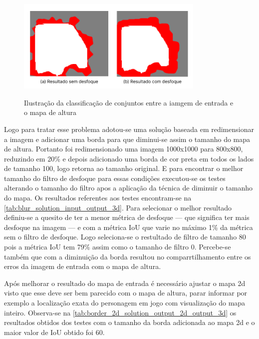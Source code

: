 \begin{figure}[!ht]
	\centering
    \caption{Ilustração da classificação de conjuntos entre a iamgem de entrada e o mapa de altura}
	\includegraphics[width=0.8\textwidth]{figures/comparacao_blur.png}
	\label{fig:comparando_blur}
\end{figure}

Logo para tratar esse problema adotou-se uma solução baseada em redimensionar a imagem e adicionar uma borda para que diminui-se assim o tamanho do mapa de altura. Portanto foi redimensionado uma imagem 1000x1000 para 800x800, reduzindo em 20\% e depois adicionado uma borda de cor preta em todos os lados de tamanho 100, logo retorna ao tamanho original. E para encontrar o melhor tamanho do filtro de desfoque para essas condições executou-se os testes alterando o tamanho do filtro apos a aplicação da técnica de diminuir o tamanho do mapa. Os resultados referentes aos testes encontram-se na \cref{tab:blur_solution_input_output_3d}. Para selecionar o melhor resultado definiu-se a quesito de ter a menor métrica de desfoque — que significa ter mais desfoque na imagem — e com a métrica IoU que varie no máximo 1\% da métrica sem o filtro de desfoque. Logo seleciona-se o restultado de filtro de tamanho 80 pois a métrica IoU tem 79\% assim como o tamanho de filtro 0. Percebe-se também que com a diminuição da borda resultou no comparrtilhamento entre os erros da imagem de entrada com o mapa de altura.



Após melhorar o resultado do mapa de entrada é necessário ajustar o mapa 2d visto que esse deve ser bem parecido com o mapa de altura, parar informar por exemplo a localização exata do personagem em jogo com visualização do mapa inteiro. Observa-se na \cref{tab:border_2d_solution_output_2d_output_3d} os resultados obtidos dos testes com o tamanho da borda adicionada ao mapa 2d e o maior valor de IoU obtido foi 60.

